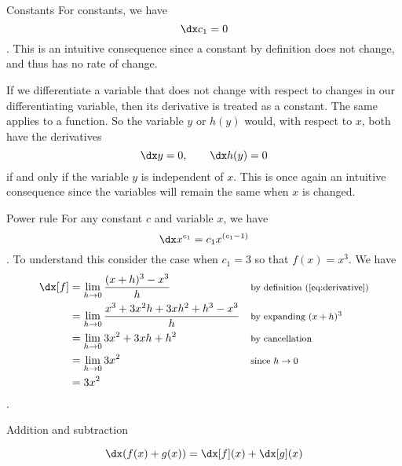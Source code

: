 \begin{psec}{Constants}\label{rule:derivative constants} For constants,
    we have
    \begin{equation}\label{eq:derivative constant}
        \dx c_1 = 0
    \end{equation}
    . This is an intuitive consequence since a constant by definition does not
    change, and thus has no rate of change.

    If we differentiate a variable that does not change with respect to changes in our differentiating variable, then its derivative is treated as a constant. The same applies to a function. So the variable $y$ or $h(y)$ would, with respect to $x$, both have the derivatives
    \begin{equation*}
        \dx y = 0, \quad \quad \dx h(y) = 0
    \end{equation*} if and only if the variable $y$ is independent of $x$. This is once again an intuitive consequence since the variables will remain the same when $x$ is changed.

\end{psec}

\begin{psec}{Power rule}\label{rule:derivative powers} For any constant $c$ and
    variable $x$, we have
    \begin{equation}\label{eq:derivative power}
        \dx x^{c_1} = c_1 x^{(c_1 - 1)}
    \end{equation}
    . To understand this consider the case when $c_1=3$ so that $f(x) = x^3$. We have
    \begin{align*}
        \dx[f] &= \lim_{h\rightarrow 0} \frac{(x + h)^3 - x^3}{h} & &
        \text{\footnotesize by definition (\ref{eq:derivative})}\\
               &= \lim_{h\rightarrow 0} \frac{x^3 +3x^2h + 3xh^2 + h^3 -
               x^3}{h} & & \text{\footnotesize by expanding $(x + h)^3$}\\
               &= \lim_{h\rightarrow 0} 3x^2 + 3xh + h^2 & &
               \text{\footnotesize by cancellation}\\
               &= \lim_{h\rightarrow 0} 3x^2 & & \text{\footnotesize since $h\rightarrow 0$} \\
               &= 3x^2 & \text{}
    \end{align*}.

\end{psec}

\begin{psec}{Addition and subtraction}\label{rule:derivative add}

    \begin{equation}\label{eq:derivative add}
        \dx (f(x) + g(x)) = \dx[f](x) + \dx[g](x)
    \end{equation}

\end{psec}

